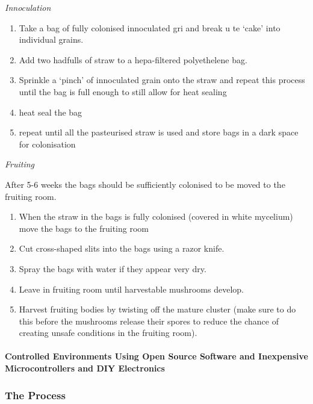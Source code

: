 \emph{Innoculation}

\begin{enumerate}
\def\labelenumi{\arabic{enumi}.}
\itemsep1pt\parskip0pt
\item
  Take a bag of fully colonised innoculated gri and break u te `cake'
  into individual grains.
\item
  Add two hadfulls of straw to a hepa-filtered polyethelene bag.
\item
  Sprinkle a `pinch' of innoculated grain onto the straw and repeat this
  process until the bag is full enough to still allow for heat sealing
\item
  heat seal the bag
\item
  repeat until all the pasteurised straw is used and store bags in a
  dark space for colonisation
\end{enumerate}

\emph{Fruiting}

After 5-6 weeks the bags should be sufficiently colonised to be moved to
the fruiting room.

\begin{enumerate}
\def\labelenumi{\arabic{enumi}.}
\itemsep1pt\parskip0pt
\item
  When the straw in the bags is fully colonised (covered in white
  mycelium) move the bags to the fruiting room
\item
  Cut cross-shaped slits into the bags using a razor knife.
\item
  Spray the bags with water if they appear very dry.
\item
  Leave in fruiting room until harvestable mushrooms develop.
\item
  Harvest fruiting bodies by twisting off the mature cluster (make sure
  to do this before the mushrooms release their spores to reduce the
  chance of creating unsafe conditions in the fruiting room).
\end{enumerate}

\paragraph{Controlled Environments Using Open Source Software and
Inexpensive Microcontrollers and DIY
Electronics}\label{controlled-environments-using-open-source-software-and-inexpensive-microcontrollers-and-diy-electronics}

\subsubsection{The Process}\label{the-process}

